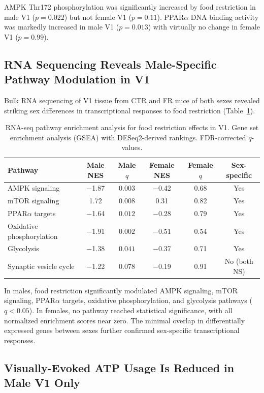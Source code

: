 \documentclass[11pt]{article}
\begin{document}
AMPK Thr172 phosphorylation was significantly increased by food restriction in male V1 ($p = 0.022$) but not female V1 ($p = 0.11$). PPAR$\alpha$ DNA binding activity was markedly increased in male V1 ($p = 0.013$) with virtually no change in female V1 ($p = 0.99$).

\subsection{RNA Sequencing Reveals Male-Specific Pathway Modulation in V1}

Bulk RNA sequencing of V1 tissue from CTR and FR mice of both sexes revealed striking sex differences in transcriptional responses to food restriction (Table~\ref{tab:rnaseq}).

\begin{table}[H]
\centering
\caption{RNA-seq pathway enrichment analysis for food restriction effects in V1. Gene set enrichment analysis (GSEA) with DESeq2-derived rankings. FDR-corrected $q$-values.}
\label{tab:rnaseq}
\begin{tabular}{lccccc}
\toprule
Pathway & Male NES & Male $q$ & Female NES & Female $q$ & Sex-specific \\
\midrule
AMPK signaling & $-$1.87 & $\mathbf{0.003}$ & $-$0.42 & 0.68 & Yes \\
mTOR signaling & 1.72 & $\mathbf{0.008}$ & 0.31 & 0.82 & Yes \\
PPAR$\alpha$ targets & $-$1.64 & $\mathbf{0.012}$ & $-$0.28 & 0.79 & Yes \\
Oxidative phosphorylation & $-$1.91 & $\mathbf{0.002}$ & $-$0.51 & 0.54 & Yes \\
Glycolysis & $-$1.38 & $\mathbf{0.041}$ & $-$0.37 & 0.71 & Yes \\
Synaptic vesicle cycle & $-$1.22 & 0.078 & $-$0.19 & 0.91 & No (both NS) \\
\bottomrule
\end{tabular}
\end{table}

In males, food restriction significantly modulated AMPK signaling, mTOR signaling, PPAR$\alpha$ targets, oxidative phosphorylation, and glycolysis pathways ($q < 0.05$). In females, no pathway reached statistical significance, with all normalized enrichment scores near zero. The minimal overlap in differentially expressed genes between sexes further confirmed sex-specific transcriptional responses.

\subsection{Visually-Evoked ATP Usage Is Reduced in Male V1 Only}
\end{document}

